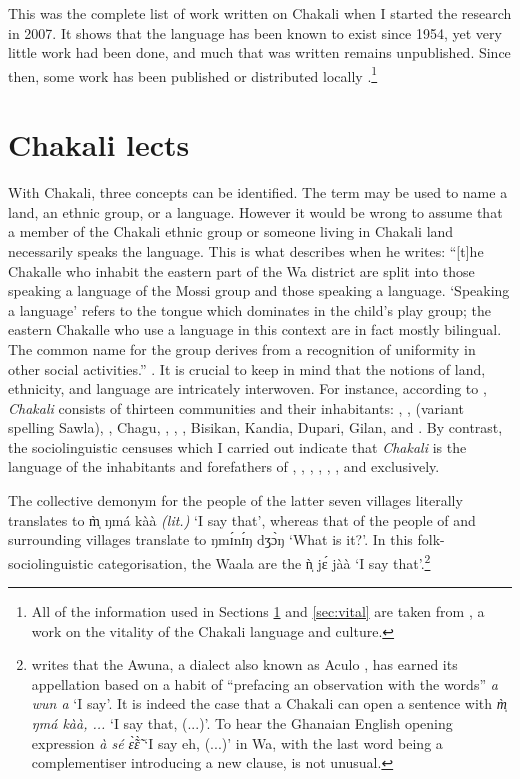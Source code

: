 This was the complete list of work written on Chakali when I started the research in 2007. It shows that the language has been known to exist since 1954, yet very little work had been done, and much that was written  remains unpublished. Since then, some work has been published or distributed locally \citep{Kang07b, Kang07a,  brin08b, brin08, brin10, brin11, Brin12, brin15c, brin16}.\footnote{All of the information used in Sections \ref{sec:lects} and \ref{sec:vital}  are taken from \citet{brin15c}, a work on the vitality of the Chakali language and culture.}

\section{Chakali lects}
\label{sec:lects}

With Chakali,    three concepts can be identified. The term may be used  to name a land,  an ethnic group,   or a language.  However it would be wrong to assume that a member of the Chakali ethnic group  or someone living in Chakali land necessarily speaks the language.  This is what \citeauthor{Good54} describes when he writes: ``[t]he Chakalle who inhabit the eastern part of the Wa district are split into those speaking a language of the Mossi group and those speaking a  language. `Speaking a language' refers to the tongue which dominates in the child's play group; the eastern Chakalle who use a  language in this context are in fact mostly bilingual. The common name for the group derives from a recognition of uniformity in other social activities.''   \citet[2]{Good54}.  It is crucial to keep in mind that the notions of land, ethnicity, and language are intricately interwoven.   For instance, according to \citet{Daan94},  {\it Chakali}  consists of  thirteen communities and their inhabitants:  , ,  ({variant} spelling Sawla), , Chagu, , , , Bisikan, Kandia, Dupari, Gilan, and .  By contrast, the sociolinguistic censuses which I carried out indicate that {\it Chakali} is the language of the inhabitants and forefathers of  , , ,  , , , and   exclusively. 

The collective demonym for the people of the latter seven villages literally translates to {\sls m̩̀ ŋmá kàà} {\it (lit.)}   `I say that', whereas that of  the people of  and surrounding villages translate to   {\sls ŋmɪ́nɪ́ŋ dʒɔ̀ŋ}  `What is it?'.   In this folk-sociolinguistic categorisation, the Waala are the {\sls ǹ̩ jɛ́ jàà} `I say that'.\footnote{\citet[525]{Ratt32b} writes that the Awuna, a  dialect also  known as Aculo \citep[147]{nade89}, has earned its appellation based on a habit of ``prefacing an observation with the words''  {\it a wun a} `I say'.  It is indeed the case that a Chakali can open a sentence with  {\it m̩̀ ŋmá kàà, ...}  `I say that, (...)'. To hear the  Ghanaian English opening expression {\it à sé ɛ̃̀ɛ̃̀}  `I say eh, (...)'   in Wa, with the last word being a complementiser introducing a new clause, is not unusual.}  

